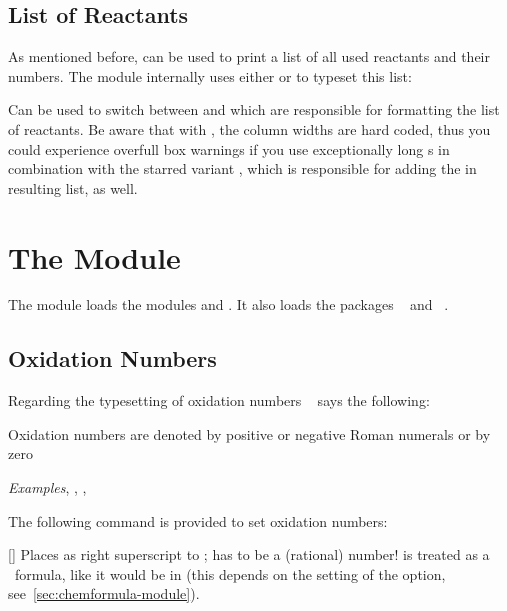 \documentclass{chemmacros-manual}
\begin{document}
\subsection{List of Reactants}\label{sec:list-of-reactants}
 As mentioned before,  can be used to print a list of all used reactants 
 and their numbers. The  module internally uses either  or 
  to typeset this list:
\begin{options}
  Can be used to switch between  and  which are responsible for
  formatting the list of reactants. Be aware that with , the column widths are 
  hard coded, thus you could experience overfull box warnings if you use exceptionally long
  s in combination with the starred variant , which is responsible 
  for adding the  in resulting list, as well.
\end{options}

\section{The  Module}\label{sec:redox-module}

The  module loads the modules  and
. It also loads the packages
~\cite{pkg:mathtools} and ~\cite{pkg:relsize}.

\subsection{Oxidation Numbers}\label{sec:oxidation-numbers}

Regarding the typesetting of oxidation numbers
~\cite{iupac:greenbook} says the following:
\begin{cnltxquote}
  Oxidation numbers are denoted by positive or negative Roman numerals or by
  zero \textelp{}

  \textit{Examples}\quad {}, , ,
\end{cnltxquote}

The following command is provided to set oxidation numbers:
\begin{commands}
  [\sarg{}]
    Places  as right superscript to ; 
    has to be a (rational) number!   is treated as a \chemformula\
    formula, like it would be in  (this depends on the setting of
    the \option{formula} option, see~\vref{sec:chemformula-module}).
\end{commands}
\end{document}
